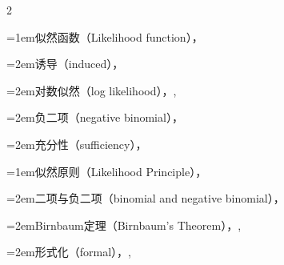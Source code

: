 \begin{multicols}{2}
\par\addvspace{2pt}
\par\noindent\hangindent=1em\hspace*{0em}\label{idx:619}似然函数（Likelihood function），\hyperref[def:6.3.1]{\pageref*{def:6.3.1}}\par
\par\noindent\hangindent=2em\hspace*{1em}\label{idx:620}诱导（induced），\hyperref[eq:7.2.5]{\pageref*{eq:7.2.5}}\par
\par\noindent\hangindent=2em\hspace*{1em}\label{idx:621}对数似然（log likelihood），\hyperref[idxocc:621:288]{\pageref*{idxocc:621:288}}, \hyperref[exercise:7.3]{\pageref*{exercise:7.3}}\par
\par\noindent\hangindent=2em\hspace*{1em}\label{idx:622}负二项（negative binomial），\hyperref[ex:6.3.2]{\pageref*{ex:6.3.2}}\par
\par\noindent\hangindent=2em\hspace*{1em}\label{idx:623}充分性（sufficiency），\hyperref[sec:6.6.3]{\pageref*{sec:6.6.3}}\par
\par\addvspace{2pt}
\par\noindent\hangindent=1em\hspace*{0em}\label{idx:624}似然原则（Likelihood Principle），\hyperref[idxocc:624:268]{\pageref*{idxocc:624:268}}\par
\par\noindent\hangindent=2em\hspace*{1em}\label{idx:625}二项与负二项（binomial and negative binomial），\hyperref[ex:6.3.7]{\pageref*{ex:6.3.7}}\par
\par\noindent\hangindent=2em\hspace*{1em}\label{idx:626}Birnbaum定理（Birnbaum’s Theorem），\hyperref[thm:6.3.6]{\pageref*{thm:6.3.6}}, \hyperref[exercise:6.33]{\pageref*{exercise:6.33}}\par
\par\noindent\hangindent=2em\hspace*{1em}\label{idx:627}形式化（formal），\hyperref[sec:6.3.2]{\pageref*{sec:6.3.2}}, \hyperref[idxocc:627:270]{\pageref*{idxocc:627:270}}\par

\end{multicols}
